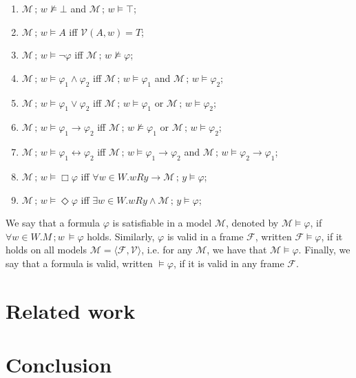 \documentclass[sigconf]{acmart}
\begin{document}
\begin{enumerate}
  \item $\mathcal{M}\,;\,w\not\models \bot$ and $\mathcal{M}\,;\,w\models \top$;
  \item $\mathcal{M}\,;\,w\models A$ iff $\mathcal{V}(A,w) = T$;
  \item $\mathcal{M}\,;\,w\models \neg\varphi$ iff $\mathcal{M}\,;\,w\not\models\varphi$;
  \item $\mathcal{M}\,;\,w\models \varphi_1 \land \varphi_2$ iff
    $\mathcal{M}\,;\,w\models\varphi_1$ and $\mathcal{M}\,;\,w\models\varphi_2$;
  \item $\mathcal{M}\,;\,w\models \varphi_1 \lor \varphi_2$ iff
    $\mathcal{M}\,;\,w\models\varphi_1$ or $\mathcal{M}\,;\,w\models\varphi_2$;
  \item $\mathcal{M}\,;\,w\models \varphi_1 \to \varphi_2$ iff
    $\mathcal{M}\,;\,w\not\models\varphi_1$ or $\mathcal{M}\,;\,w\models\varphi_2$;
  \item $\mathcal{M}\,;\,w\models \varphi_1 \leftrightarrow \varphi_2$ iff
    $\mathcal{M}\,;\,w\models\varphi_1 \to \varphi_2$ and
    $\mathcal{M}\,;\,w\models\varphi_2\to\varphi_1$;
  \item $\mathcal{M}\,;\,w\models\Box\varphi$ iff $\forall w \in W. w R y \to \mathcal{M}\,;\,y \models\varphi$;
  \item $\mathcal{M}\,;\,w\models\Diamond\varphi$ iff $\exists w \in W. w R y \land \mathcal{M}\,;\,y \models\varphi$;
\end{enumerate}  

We say that a formula $\varphi$ is satisfiable in a model $\mathcal{M}$,
denoted by $\mathcal{M}\models \varphi$, if $\forall w \in W. M\,;w\,\models \varphi$ holds.
Similarly, $\varphi$ is valid in a frame $\mathcal{F}$, written $\mathcal{F}\models\varphi$, if
it holds on all models $\mathcal{M} = \langle \mathcal{F},\mathcal{V}\rangle$, i.e.
for any $\mathcal{M}$, we have that $\mathcal{M}\models\varphi$. Finally, we say that a formula
is valid, written $\models \varphi$, if it is valid in any frame $\mathcal{F}$.


\section{Related work}\label{sec:related}

\section{Conclusion}\label{sec:conclusion}





\end{document}
